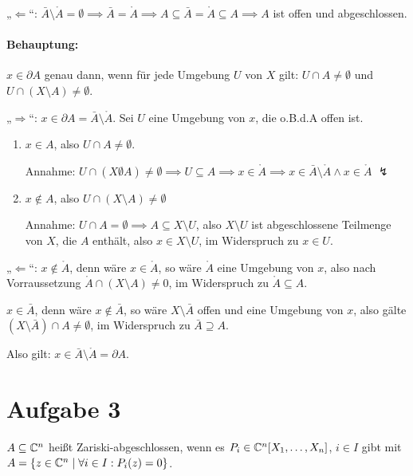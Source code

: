 \documentclass{article}
\begin{document}
„$\Longleftarrow$“: $\bar A \setminus \mathring A = \emptyset \implies \bar A = \mathring A \implies A\subseteq \bar A = \mathring A \subseteq A \implies A$ ist offen und abgeschlossen.

\paragraph{Behauptung:} $x\in \partial A$ genau dann, wenn für jede Umgebung $U$ von $X$ gilt: $U\cap A \ne \emptyset$ und $U \cap (X\setminus A) \ne \emptyset$.

„$\Longrightarrow$“: $x\in \partial A = \bar A \setminus \mathring A$. Sei $U$ eine Umgebung von $x$, die o.B.d.A offen ist.

\begin{enumerate}[1. {Fall}:]
\item $x\in A$, also $U\cap A \ne \emptyset$.

Annahme: $U\cap (X\emptyset A) \ne \emptyset \implies U \subseteq A \implies x\in \mathring A \implies x\in \bar A \setminus \mathring A \wedge x \in \mathring A$ $\lightning$

\item $x\notin A$, also $U \cap (X \setminus A)\ne \emptyset$

Annahme: $U \cap A = \emptyset \implies A \subseteq X\setminus U$, also $X\setminus U$ ist abgeschlossene Teilmenge von $X$, die $A$ enthält, also $x\in X\setminus U$, im Widerspruch zu $x\in U$.

\end{enumerate}

„$\Longleftarrow$“: $x\notin \mathring A$, denn wäre $x\in \mathring A$, so wäre $\mathring A$ eine Umgebung von $x$, also nach Vorraussetzung $\mathring A\cap (X\setminus A) \ne 0$, im Widerspruch zu $\mathring A \subseteq A$.

$x\in \bar A$, denn wäre $x\notin \bar A$, so wäre $X\setminus \bar A$ offen und eine Umgebung von $x$, also gälte $(X\setminus \bar A) \cap A \ne \emptyset$, im Widerspruch zu $\bar A \supseteq A$.

Also gilt: $x\in \bar A \setminus \mathring A = \partial A$.


\section*{Aufgabe 3}

$A \subseteq \mathbb{C}^n$ heißt Zariski-abgeschlossen, wenn es $P_i\in \mathbb{C}^n[X_1,\ldots,X_n]$, $i\in I$ gibt mit $A = \{z\in \mathbb{C}^n \mid \forall i\in I: P_i(z)=0\}$.
\end{document}

